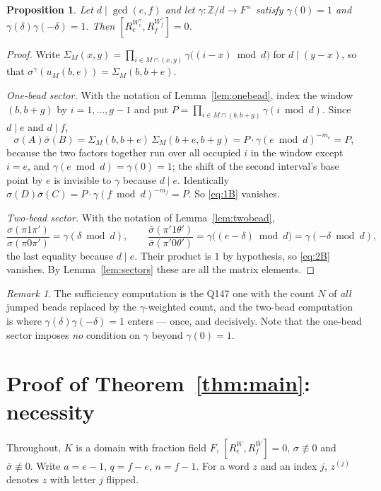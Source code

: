 \documentclass[11pt]{article}
\newtheorem{proposition}[theorem]{Proposition}
\theoremstyle{definition}
\theoremstyle{remark}
\newtheorem{remark}[theorem]{Remark}
\newcommand{\Z}{\mathbb{Z}}
\begin{document}
\begin{proposition}\label{prop:suff}
Let $d\mid\gcd(e,f)$ and let $\gamma:\Z/d\to F^{\times}$ satisfy $\gamma(0)=1$ and
$\gamma(\delta)\gamma(-\delta)=1$.  Then $[R_e^{W^{\gamma}_e},R_f^{W^{\gamma}_f}]=0$.
\end{proposition}

\begin{proof}
Write $\Sigma_M(x,y)=\prod_{i\in M\cap(x,y)}\gamma\bigl((i-x)\bmod d\bigr)$ for
$d\mid(y-x)$, so that $\sigma^{\gamma}(u_M(b,e))=\Sigma_M(b,b+e)$.

\emph{One-bead sector.}  With the notation of Lemma~\ref{lem:onebead}, index the window
$(b,b+g)$ by $i=1,\dots,g-1$ and put
$P=\prod_{i\in M\cap(b,b+g)}\gamma(i\bmod d)$.  Since $d\mid e$ and $d\mid f$,
\[
  \sigma(A)\bar\sigma(B)=\Sigma_M(b,b+e)\,\Sigma_M(b+e,b+g)
  = P\cdot\gamma(e\bmod d)^{-m_e}=P,
\]
because the two factors together run over all occupied $i$ in the window except $i=e$,
and $\gamma(e\bmod d)=\gamma(0)=1$; the shift of the second interval's base point by $e$
is invisible to $\gamma$ because $d\mid e$.  Identically
$\sigma(D)\bar\sigma(C)=P\cdot\gamma(f\bmod d)^{-m_f}=P$.  So \eqref{eq:1B} vanishes.

\emph{Two-bead sector.}  With the notation of Lemma~\ref{lem:twobead},
\[
   \frac{\sigma(\pi1\pi')}{\sigma(\pi0\pi')}=\gamma(\delta\bmod d),\qquad
   \frac{\bar\sigma(\pi'1\theta')}{\bar\sigma(\pi'0\theta')}=\gamma\bigl((e-\delta)\bmod d\bigr)
   =\gamma(-\delta\bmod d),
\]
the last equality because $d\mid e$.  Their product is $1$ by hypothesis, so \eqref{eq:2B}
vanishes.  By Lemma~\ref{lem:sectors} these are all the matrix elements.
\end{proof}

\begin{remark}
The sufficiency computation is the Q147 one with the count $N$ of \emph{all} jumped beads
replaced by the $\gamma$-weighted count, and the two-bead computation is where
$\gamma(\delta)\gamma(-\delta)=1$ enters --- once, and decisively.  Note that the
one-bead sector imposes \emph{no} condition on $\gamma$ beyond $\gamma(0)=1$.
\end{remark}

\section{Proof of Theorem~\ref{thm:main}: necessity}

Throughout, $K$ is a domain with fraction field $F$, $[R_e^{W},R_f^{\bar W}]=0$,
$\sigma\not\equiv0$ and $\bar\sigma\not\equiv0$.  Write $a=e-1$, $q=f-e$, $n=f-1$.  For a
word $z$ and an index $j$, $z^{(j)}$ denotes $z$ with letter $j$ flipped.
\end{document}
